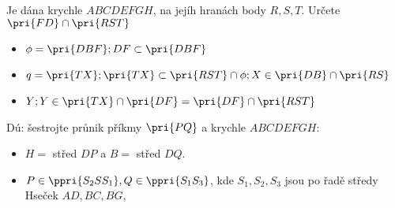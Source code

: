 \Pr Je dána krychle $ABCDEFGH$, na jejíh hranách body $R,S,T$. Určete $\pri{FD}\cap\pri{RST}$
\begin{itemize}
	\item $\phi = \pri{DBF}; DF\subset\pri{DBF}$
	\item $q=\pri{TX}; \pri{TX} \subset \pri{RST} \cap \phi; X\in \pri{DB} \cap \pri{RS}$
	\item $Y;Y\in \pri{TX}\cap \pri{DF} = \pri{DF} \cap \pri{RST}$
\end{itemize}

\Pr Dú: šestrojte průnik příkmy $\pri{PQ}$ a krychle $ABCDEFGH$:
\begin{itemize}
	\item $H=$ střed $DP$ a $B=$ střed $DQ$.
	\item $P\in\ppri{S_2SS_1}, Q\in\ppri{S_1S_3}$, kde $S_1,S_2,S_3$ jsou po řadě středy Hseček $AD,BC,BG$,
\end{itemize}
\EndDoc


